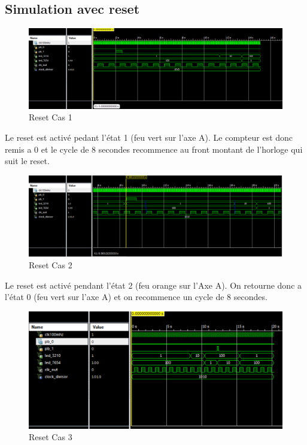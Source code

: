 \documentclass[11pt]{report}
\begin{document}
\subsection{Simulation avec reset}

\begin{figure}[h]
\includegraphics[width=13cm]{TP03-6.png}
\caption{Reset Cas 1}
\end{figure}

Le reset est activé pedant l'état 1 (feu vert sur l'axe A).
Le compteur est donc remis a 0 et le cycle de 8 secondes recommence au front montant de l'horloge qui suit le reset.

\begin{figure}[h]
\includegraphics[width=13cm]{TP03-7.png}
\caption{Reset Cas 2}
\end{figure}

Le reset est activé pendant l'état 2 (feu orange sur l'Axe A).
On retourne donc a l'état 0 (feu vert sur l'axe A) et on recommence un cycle de 8 secondes.

\begin{figure}[h]
\includegraphics[width=13cm]{TP03-8.png}
\caption{Reset Cas 3}
\end{figure}
\end{document}
